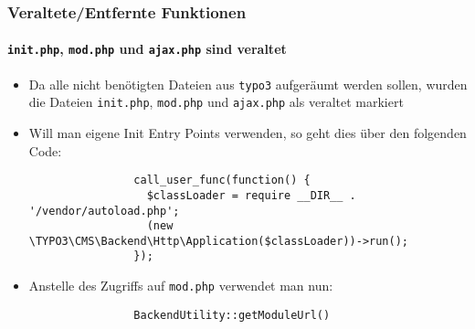 \begin{frame}[fragile]
	\frametitle{Veraltete/Entfernte Funktionen}
	\framesubtitle{\texttt{init.php}, \texttt{mod.php} und \texttt{ajax.php} sind veraltet}


	\begin{itemize}

		\item Da alle nicht benötigten Dateien aus \texttt{typo3} aufgeräumt werden sollen,
			wurden die Dateien \texttt{init.php}, \texttt{mod.php} und \texttt{ajax.php}
			als veraltet markiert

		\item Will man eigene Init Entry Points verwenden, so geht dies über den folgenden Code:

			\begin{lstlisting}
				call_user_func(function() {
				  $classLoader = require __DIR__ . '/vendor/autoload.php';
				  (new \TYPO3\CMS\Backend\Http\Application($classLoader))->run();
				});
			\end{lstlisting}

		\item Anstelle des Zugriffs auf \texttt{mod.php} verwendet man nun:

			\begin{lstlisting}
				BackendUtility::getModuleUrl()
			\end{lstlisting}

	\end{itemize}

\end{frame}


